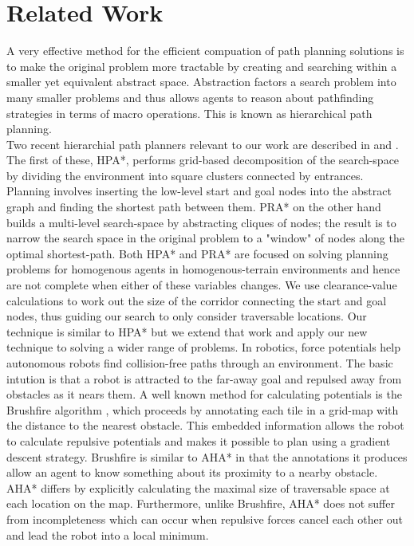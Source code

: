 \section{Related Work}
A very effective method for the efficient compuation of path planning solutions is to make the original problem more tractable by creating and searching within a smaller yet equivalent abstract space. Abstraction factors a search problem into many smaller problems and thus allows agents to reason about pathfinding strategies in terms of macro operations. This is known as hierarchical path planning. \\ \newline
Two recent hierarchial path planners relevant to our work are described in \cite{botea04} and \cite{sturtevant05}. The first of these, HPA*, performs grid-based decomposition of the search-space by dividing the environment into square clusters connected by entrances. Planning involves inserting the low-level start and goal nodes into the abstract graph and finding the shortest path between them. 
PRA* on the other hand builds a multi-level search-space by abstracting cliques of nodes; the result is to narrow the search space in the original problem to a "window" of nodes along the optimal shortest-path.\newline
Both HPA* and PRA* are focused on solving planning problems for homogenous agents in homogenous-terrain environments and hence are not complete when either of these variables changes. 
We use clearance-value calculations to work out the size of the corridor connecting the start and goal nodes, thus guiding our search to only consider traversable locations. 
Our technique is similar to HPA* but we extend that work and apply our new technique to solving a wider range of problems. 
\medskip
In robotics, force potentials help autonomous robots find collision-free paths through an environment. The basic intution is that a robot is attracted to the far-away goal and repulsed away from obstacles as it nears them. A well known method for calculating potentials is the Brushfire algorithm \cite{latombe91}, which proceeds by annotating each tile in a grid-map with the distance to the nearest obstacle. This embedded information allows the robot to calculate repulsive potentials and makes it possible to plan using a gradient descent strategy. \newline
Brushfire is similar to AHA* in that the annotations it produces allow an agent to know something about its proximity to a nearby obstacle. AHA* differs by explicitly calculating the maximal size of traversable space at each location on the map. Furthermore, unlike Brushfire, AHA* does not suffer from incompleteness which can occur when repulsive forces cancel each other out and lead the robot into a local minimum.
